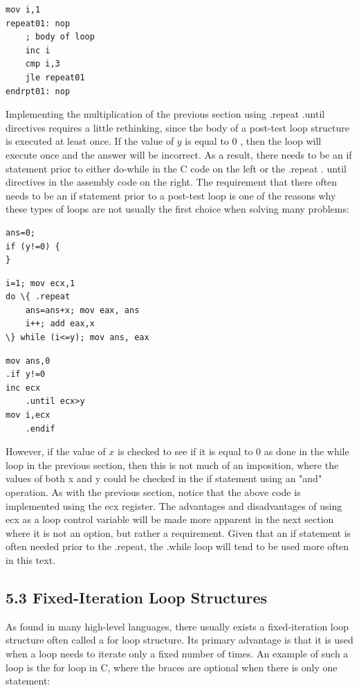 \documentclass[10pt]{book}
\begin{document}
\begin{verbatim}
mov i,1
repeat01: nop
    ; body of loop
    inc i
    cmp i,3
    jle repeat01
endrpt01: nop
\end{verbatim}

Implementing the multiplication of the previous section using .repeat .until directives requires a little rethinking, since the body of a post-test loop structure is executed at least once. If the value of $y$ is equal to 0 , then the loop will execute once and the answer will be incorrect. As a result, there needs to be an if statement prior to either do-while in the C code on the left or the .repeat . until directives in the assembly code on the right. The requirement that there often needs to be an if statement prior to a post-test loop is one of the reasons why these types of loops are not usually the first choice when solving many problems:

\begin{verbatim}
ans=0;
if (y!=0) {
}
\end{verbatim}

\begin{verbatim}
i=1; mov ecx,1
do \{ .repeat
    ans=ans+x; mov eax, ans
    i++; add eax,x
\} while (i<=y); mov ans, eax
\end{verbatim}

\begin{verbatim}
mov ans,0
.if y!=0
inc ecx
    .until ecx>y
mov i,ecx
    .endif
\end{verbatim}

However, if the value of $x$ is checked to see if it is equal to 0 as done in the while loop in the previous section, then this is not much of an imposition, where the values of both x and y could be checked in the if statement using an "and" operation. As with the previous section, notice that the above code is implemented using the ecx register. The advantages and disadvantages of using ecx as a loop control variable will be made more apparent in the next section where it is not an option, but rather a requirement. Given that an if statement is often needed prior to the .repeat, the .while loop will tend to be used more often in this text.

\subsection*{5.3 Fixed-Iteration Loop Structures}
As found in many high-level languages, there usually exists a fixed-iteration loop structure often called a for loop structure. Its primary advantage is that it is used when a loop needs to iterate only a fixed number of times. An example of such a loop is the for loop in C, where the braces are optional when there is only one statement:
\end{document}
